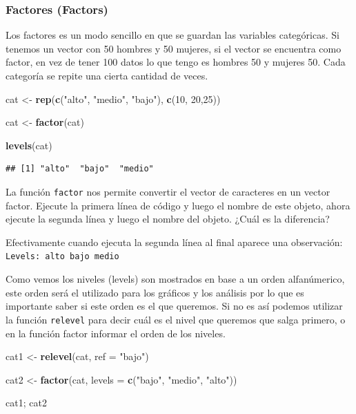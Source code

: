\documentclass[]{article}
\newenvironment{Shaded}{\begin{snugshade}}{\end{snugshade}}
\newcommand{\KeywordTok}[1]{\textcolor[rgb]{0.13,0.29,0.53}{\textbf{{#1}}}}
\newcommand{\DataTypeTok}[1]{\textcolor[rgb]{0.13,0.29,0.53}{{#1}}}
\newcommand{\DecValTok}[1]{\textcolor[rgb]{0.00,0.00,0.81}{{#1}}}
\newcommand{\StringTok}[1]{\textcolor[rgb]{0.31,0.60,0.02}{{#1}}}
\newcommand{\NormalTok}[1]{{#1}}
\begin{document}
\subsubsection{Factores (Factors)}\label{factores-factors}

Los factores es un modo sencillo en que se guardan las variables
categóricas. Si tenemos un vector con 50 hombres y 50 mujeres, si el
vector se encuentra como factor, en vez de tener 100 datos lo que tengo
es hombres 50 y mujeres 50. Cada categoría se repite una cierta cantidad
de veces.

\begin{Shaded}
\begin{Highlighting}[]
\NormalTok{cat <-}\StringTok{ }\KeywordTok{rep}\NormalTok{(}\KeywordTok{c}\NormalTok{(}\StringTok{"alto"}\NormalTok{, }\StringTok{"medio"}\NormalTok{, }\StringTok{"bajo"}\NormalTok{), }\KeywordTok{c}\NormalTok{(}\DecValTok{10}\NormalTok{, }\DecValTok{20}\NormalTok{,}\DecValTok{25}\NormalTok{))}

\NormalTok{cat <-}\StringTok{ }\KeywordTok{factor}\NormalTok{(cat) }

\KeywordTok{levels}\NormalTok{(cat)}
\end{Highlighting}
\end{Shaded}

\begin{verbatim}
## [1] "alto"  "bajo"  "medio"
\end{verbatim}

La función \texttt{factor} nos permite convertir el vector de caracteres
en un vector factor. Ejecute la primera línea de código y luego el
nombre de este objeto, ahora ejecute la segunda línea y luego el nombre
del objeto. ¿Cuál es la diferencia?

Efectivamente cuando ejecuta la segunda línea al final aparece una
observación: \texttt{Levels:\ alto\ bajo\ medio}

Como vemos los niveles (levels) son mostrados en base a un orden
alfanúmerico, este orden será el utilizado para los gráficos y los
análisis por lo que es importante saber si este orden es el que
queremos. Si no es así podemos utilizar la función \texttt{relevel} para
decir cuál es el nivel que queremos que salga primero, o en la función
factor informar el orden de los niveles.

\begin{Shaded}
\begin{Highlighting}[]
\NormalTok{cat1 <-}\StringTok{ }\KeywordTok{relevel}\NormalTok{(cat, }\DataTypeTok{ref =} \StringTok{"bajo"}\NormalTok{)}

\NormalTok{cat2 <-}\StringTok{ }\KeywordTok{factor}\NormalTok{(cat, }\DataTypeTok{levels =} \KeywordTok{c}\NormalTok{(}\StringTok{"bajo"}\NormalTok{, }\StringTok{"medio"}\NormalTok{, }\StringTok{"alto"}\NormalTok{))}

\NormalTok{cat1; cat2}
\end{Highlighting}
\end{Shaded}
\end{document}
